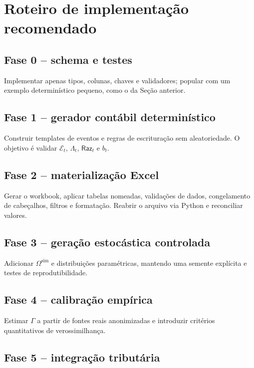 \documentclass[11pt,a4paper]{article}
\newcommand{\cE}{\mathcal{E}}
\newcommand{\Raz}{\mathsf{Raz}}
\begin{document}
\section{Roteiro de implementação recomendado}

\subsection{Fase 0 -- schema e testes}

Implementar apenas tipos, colunas, chaves e validadores; popular com um exemplo determinístico pequeno, como o da Seção anterior.

\subsection{Fase 1 -- gerador contábil determinístico}

Construir templates de eventos e regras de escrituração sem aleatoriedade. O objetivo é validar $\cE_t$, $\Lambda_t$, $\Raz_t$ e $b_t$.

\subsection{Fase 2 -- materialização Excel}

Gerar o workbook, aplicar tabelas nomeadas, validações de dados, congelamento de cabeçalhos, filtros e formatação. Reabrir o arquivo via Python e reconciliar valores.

\subsection{Fase 3 -- geração estocástica controlada}

Adicionar $\Omega^{\mathrm{sim}}$ e distribuições paramétricas, mantendo uma semente explícita e testes de reprodutibilidade.

\subsection{Fase 4 -- calibração empírica}

Estimar $\Gamma$ a partir de fontes reais anonimizadas e introduzir critérios quantitativos de verossimilhança.

\subsection{Fase 5 -- integração tributária}
\end{document}
